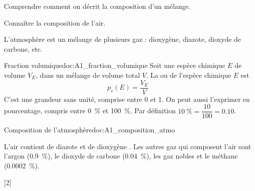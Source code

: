 \teteSndCorp

\vspace*{-36pt}


\begin{objectifs}
  \item Comprendre comment on décrit la composition d'un mélange.
  \item Connaître la composition de l'air.
\end{objectifs}

\begin{contexte}
  L'atmosphère est un mélange de plusieurs gaz : dioxygène, diazote, dioxyde de carbone, etc.
  
\end{contexte}


\begin{doc}{Fraction volumique}{doc:A1_fraction_volumique}
  Soit une espèce chimique $E$ de volume $V_E$, dans un mélange de volume total $V$.
  La  ou  de l'espèce chimique $E$ est
  \begin{equation*}
    p_{v}(E) = \frac{V_E}{V}
  \end{equation*}
  C'est une grandeur sans unité, comprise entre 0 et 1.
  On peut aussi l'exprimer en pourcentage, compris entre \qty{0}{\percent} et \qty{100}{\percent}.
  Par définition $\qty{10}{\percent} = \dfrac{10}{100} = \num{0,10}$.
\end{doc}

\begin{doc}{Composition de l'atmosphère}{doc:A1_composition_atmo}
  \begin{importants}
    L’air contient  de diazote \diazote et  de dioxygène \dioxygene.
    Les autres gaz qui composent l’air sont l’argon  (\qty{0,9}{\percent}),
    le dioxyde de carbone \dioxydeDeCarbone (\qty{0,04}{\percent}),
    les gaz nobles et le méthane \methane (\qty{0,0002}{\percent}).
  \end{importants}
\end{doc}


[2]

